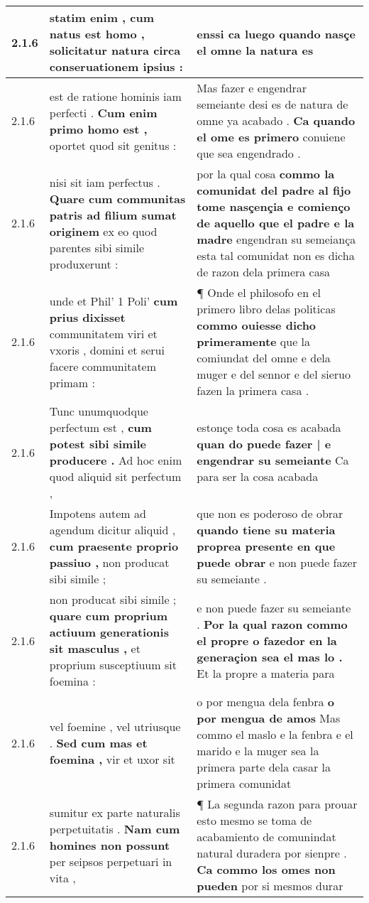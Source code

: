 \begin{tabular}{|p{1cm}|p{6.5cm}|p{6.5cm}|}
2.1.6 & statim enim , \textbf{ cum natus est homo , } solicitatur natura circa conseruationem ipsius : & enssi \textbf{ ca luego quando nasçe el omne } la natura es \\\hline
2.1.6 & est de ratione hominis iam perfecti . \textbf{ Cum enim primo homo est , } oportet quod sit genitus : & Mas fazer e engendrar semeiante desi es de natura de omne ya acabado . \textbf{ Ca quando el ome es primero } conuiene que sea engendrado . \\\hline
2.1.6 & nisi sit iam perfectus . \textbf{ Quare cum communitas patris ad filium sumat originem } ex eo quod parentes sibi simile produxerunt : & por la qual cosa \textbf{ commo la comunidat del padre al fijo tome nasçençia e comienço de aquello que el padre e la madre } engendran su semeiança esta tal comunidat non es dicha de razon dela primera casa \\\hline
2.1.6 & unde et Phil’ 1 Poli’ \textbf{ cum prius dixisset } communitatem viri et vxoris , domini et serui facere communitatem primam : & ¶ Onde el philosofo en el primero libro delas politicas \textbf{ commo ouiesse dicho primeramente } que la comiundat del omne e dela muger e del sennor e del sieruo fazen la primera casa . \\\hline
2.1.6 & Tunc unumquodque perfectum est , \textbf{ cum potest sibi simile producere . } Ad hoc enim quod aliquid sit perfectum , & estonçe toda cosa es acabada \textbf{ quan do puede fazer | e engendrar su semeiante } Ca para ser la cosa acabada \\\hline
2.1.6 & Impotens autem ad agendum dicitur aliquid , \textbf{ cum praesente proprio passiuo , } non producat sibi simile ; & que non es poderoso de obrar \textbf{ quando tiene su materia proprea presente en que puede obrar } e non puede fazer su semeiante . \\\hline
2.1.6 & non producat sibi simile ; \textbf{ quare cum proprium actiuum generationis sit masculus , } et proprium susceptiuum sit foemina : & e non puede fazer su semeiante . \textbf{ Por la qual razon commo el propre o fazedor en la generaçion sea el mas lo . } Et la propre a materia para \\\hline
2.1.6 & vel foemine , vel utriusque . \textbf{ Sed cum mas et foemina , } vir et uxor sit & o por mengua dela fenbra \textbf{ o por mengua de amos } Mas commo el maslo e la fenbra e el marido e la muger sea la primera parte dela casar la primera comunidat \\\hline
2.1.6 & sumitur ex parte naturalis perpetuitatis . \textbf{ Nam cum homines non possunt } per seipsos perpetuari in vita , & ¶ La segunda razon para prouar esto mesmo se toma de acabamiento de comunindat natural duradera por sienpre . \textbf{ Ca commo los omes non pueden } por si mesmos durar \\\hline

\end{tabular}

